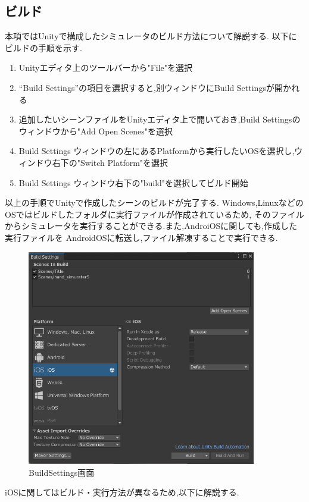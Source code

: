 \documentclass{ltjsreport}
\begin{document}
		\subsection{ビルド}
			本項ではUnityで構成したシミュレータのビルド方法について解説する.
			以下にビルドの手順を示す.
			\begin{enumerate}
				\item Unityエディタ上のツールバーから"File"を選択
				\item ``Build Settings''の項目を選択すると,別ウィンドウにBuild Settingsが開かれる
				\item 追加したいシーンファイルをUnityエディタ上で開いておき,Build Settingsのウィンドウから"Add Open Scenes"を選択
				\item Build Settings ウィンドウの左にあるPlatformから実行したいOSを選択し,ウィンドウ右下の"Switch Platform"を選択
				\item Build Settings ウィンドウ右下の"build"を選択してビルド開始
			\end{enumerate}
			以上の手順でUnityで作成したシーンのビルドが完了する.
			Windows,LinuxなどのOSではビルドしたフォルダに実行ファイルが作成されているため,
			そのファイルからシミュレータを実行することができる.また,AndroiOSに関しても,作成した実行ファイルを
			AndroidOSに転送し,ファイル解凍することで実行できる.

			\begin{figure}[H]
			\centering
			\includegraphics[width = 10cm]{../figs/BuildSettings.png}
			\caption{BuildSettings画面}
			\label{fig:BuildSettings}
			\end{figure}

			iOSに関してはビルド・実行方法が異なるため,以下に解説する.
\end{document}
